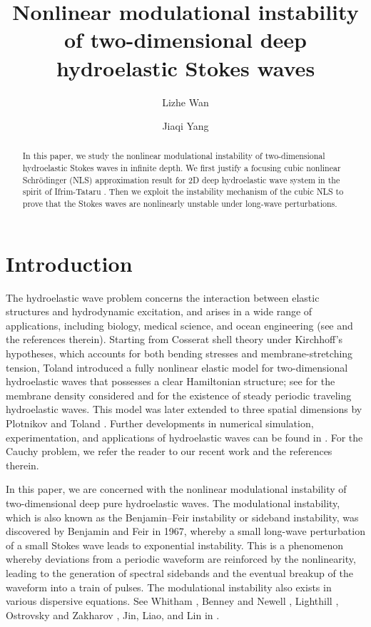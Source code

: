 \documentclass[12pt]{amsart}
\author{Lizhe Wan}
\author{Jiaqi Yang}
\theoremstyle{remark}
\theoremstyle{definition}
\numberwithin{equation}{section}
\begin{document}
\title{Nonlinear modulational instability of two-dimensional deep hydroelastic Stokes waves}

\begin{abstract}
In this paper, we study the nonlinear modulational instability of two-dimensional hydroelastic Stokes waves in infinite depth.
We first justify a focusing cubic nonlinear Schr\"odinger (NLS) approximation result for 2D deep hydroelastic wave system in the spirit of Ifrim-Tataru \cite{ifrim2019nls}.
Then we exploit the instability mechanism of the cubic NLS to prove that the Stokes waves are nonlinearly unstable under long-wave perturbations. 
\end{abstract}

\maketitle
    	

\section{Introduction}
The hydroelastic wave problem concerns the interaction between elastic structures and hydrodynamic excitation, and arises in a wide range of applications, including biology, medical science, and ocean engineering (see \cite{MR2333062, MR1312617} and the references therein). 
Starting from Cosserat shell theory under Kirchhoff’s hypotheses, which accounts for both bending stresses and membrane-stretching tension, Toland \cite{MR2413099} introduced a fully nonlinear elastic model for two-dimensional hydroelastic waves that possesses a clear Hamiltonian structure; see \cite{T07} for the membrane density considered and \cite{BT11} for the existence of steady periodic traveling hydroelastic waves. 
This model was later extended to three spatial dimensions by Plotnikov and Toland \cite{MR2812947}. 
Further developments in numerical simulation, experimentation, and applications of hydroelastic waves can be found in \cite{MR2812939,MR4823877}. 
For the Cauchy problem, we refer the reader to our recent work \cite{WanY} and the references therein.

In this paper, we are concerned with the nonlinear modulational instability of two-dimensional deep pure hydroelastic waves. 
The modulational instability, which is also known as the Benjamin–Feir instability or sideband instability, was discovered by Benjamin and Feir \cite{BF67} in 1967, whereby a small long-wave perturbation of a small Stokes wave leads to exponential instability. 
This is a phenomenon whereby deviations from a periodic waveform are reinforced by the nonlinearity, leading to the generation of spectral sidebands and the eventual breakup of the waveform into a train of pulses. 
The modulational instability also exists in various dispersive equations. See Whitham \cite{W67}, Benney and Newell \cite{BN67}, Lighthill \cite{L68}, Ostrovsky and Zakharov \cite{ZO09}, Jin, Liao, and Lin in \cite{JLL19}.
\end{document}
